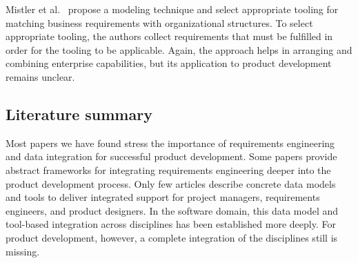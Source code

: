     Mistler et al.~\cite{9447081} propose a modeling technique and select appropriate tooling for matching business requirements with organizational structures.
    To select appropriate tooling, the authors collect requirements that must be fulfilled in order for the tooling to be applicable.
    Again, the approach helps in arranging and combining enterprise capabilities, but its application to product development remains unclear.

    \subsection*{Literature summary}
    Most papers we have found stress the importance of requirements engineering and data integration for successful product development.
    Some papers provide abstract frameworks for integrating requirements engineering deeper into the product development process.
    Only few articles describe concrete data models and tools to deliver  integrated support for project managers, requirements engineers, and product designers.
    In the software domain, this data model and tool-based integration across disciplines has been established more deeply.
    For product development, however, a complete integration of the disciplines still is missing.